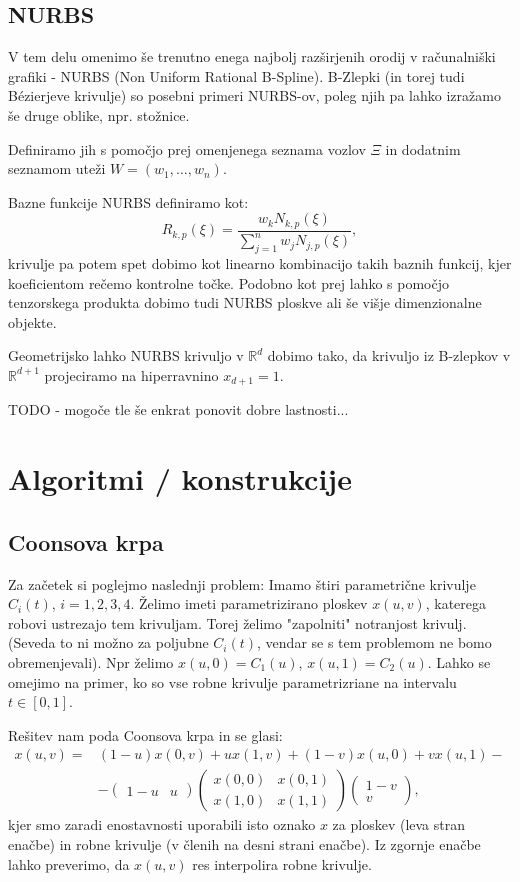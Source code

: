 \documentclass{article}
\begin{document}
\subsection{NURBS}

V tem delu omenimo še trenutno enega najbolj razširjenih orodij v računalniški grafiki - NURBS (Non Uniform Rational B-Spline).
B-Zlepki (in torej tudi Bézierjeve krivulje) so posebni primeri NURBS-ov, poleg njih pa lahko izražamo še druge oblike, npr. stožnice.

Definiramo jih s pomočjo prej omenjenega seznama vozlov $\Xi$ in dodatnim seznamom uteži $W = (w_1, \dots , w_n)$.

Bazne funkcije NURBS definiramo kot:
\begin{equation}
R_{k,p} (\xi) = \frac{w_k N_{k,p} (\xi)}{\sum_{j=1}^n w_j N_{j,p}(\xi)},
\end{equation}
krivulje pa potem spet dobimo kot linearno kombinacijo takih baznih funkcij, kjer koeficientom rečemo kontrolne točke. Podobno kot prej lahko s pomočjo tenzorskega produkta dobimo tudi NURBS ploskve ali še višje dimenzionalne objekte.

Geometrijsko lahko NURBS krivuljo v $\mathbb{R}^d$ dobimo tako, da krivuljo iz B-zlepkov v $\mathbb{R}^{d+1}$ projeciramo na hiperravnino $x_{d+1}=1$.

TODO - mogoče tle še enkrat ponovit dobre lastnosti...
\section{Algoritmi / konstrukcije}
\subsection{Coonsova krpa}

Za začetek si poglejmo naslednji problem:
Imamo štiri parametrične krivulje $C_i(t)$, $i=1,2,3,4$. 
Želimo imeti parametrizirano ploskev $x(u,v)$, katerega robovi ustrezajo tem krivuljam. Torej želimo "zapolniti" notranjost krivulj. (Seveda to ni možno za poljubne $C_i (t)$, vendar se s tem problemom ne bomo obremenjevali). 
Npr želimo $x(u,0) = C_1(u)$, $x(u,1) = C_2(u)$. Lahko se omejimo na primer, ko so vse robne krivulje parametrizriane na intervalu $t \in [0,1]$.

Rešitev nam poda Coonsova krpa in se glasi:
\begin{align}
x(u,v) =& (1-u) x(0,v) + u x(1,v) + (1-v) x(u,0) + v x(u,1) - \nonumber \\&- 
\begin{pmatrix} 1-u & u \end{pmatrix} \begin{pmatrix} x(0,0) & x(0,1) \\ x(1,0) & x(1,1) \end{pmatrix}
\begin{pmatrix} 1-v \\ v \end{pmatrix},
\end{align}
kjer smo zaradi enostavnosti uporabili isto oznako $x$ za ploskev (leva stran enačbe) in robne krivulje (v členih na desni strani enačbe). Iz zgornje enačbe lahko preverimo, da $x(u,v)$ res interpolira robne krivulje.
\end{document}
